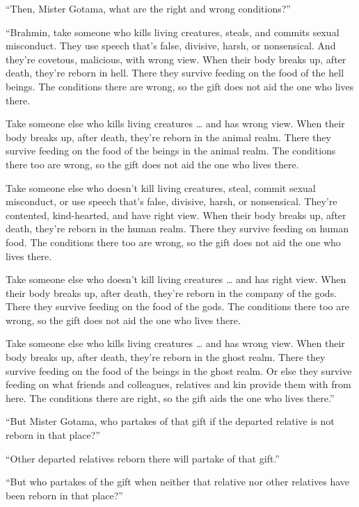 \documentclass[12pt,openany]{book}%
\begin{document}
“Then, Mister Gotama, what are the right and wrong conditions?” 

“Brahmin, take someone who kills living creatures, steals, and commits sexual misconduct. They use speech that’s false, divisive, harsh, or nonsensical. And they’re covetous, malicious, with wrong view. When their body breaks up, after death, they’re reborn in hell. There they survive feeding on the food of the hell beings. The conditions there are wrong, so the gift does not aid the one who lives there. 

Take someone else who kills living creatures … and has wrong view. When their body breaks up, after death, they’re reborn in the animal realm. There they survive feeding on the food of the beings in the animal realm. The conditions there too are wrong, so the gift does not aid the one who lives there. 

Take someone else who doesn’t kill living creatures, steal, commit sexual misconduct, or use speech that’s false, divisive, harsh, or nonsensical. They're contented, kind-hearted, and have right view. When their body breaks up, after death, they’re reborn in the human realm. There they survive feeding on human food. The conditions there too are wrong, so the gift does not aid the one who lives there. 

Take someone else who doesn’t kill living creatures … and has right view. When their body breaks up, after death, they’re reborn in the company of the gods. There they survive feeding on the food of the gods. The conditions there too are wrong, so the gift does not aid the one who lives there. 

Take someone else who kills living creatures … and has wrong view. When their body breaks up, after death, they’re reborn in the ghost realm. There they survive feeding on the food of the beings in the ghost realm. Or else they survive feeding on what friends and colleagues, relatives and kin provide them with from here. The conditions there are right, so the gift aids the one who lives there.” 

“But Mister Gotama, who partakes of that gift if the departed relative is not reborn in that place?” 

“Other departed relatives reborn there will partake of that gift.” 

“But who partakes of the gift when neither that relative nor other relatives have been reborn in that place?” 
\end{document}
